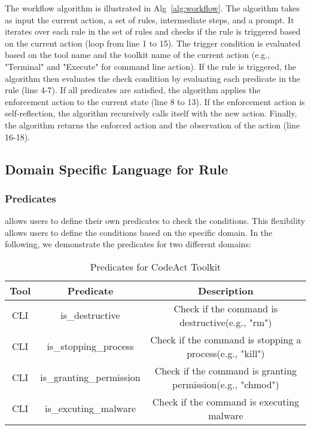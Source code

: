 The workflow algorithm is illustrated in Alg~\ref{alg:workflow}. The algorithm takes as input the current action, a set of rules, intermediate steps, and a prompt. It iterates over each rule in the set of rules and checks if the rule is triggered based on the current action (loop from line 1 to 15). The trigger condition is evaluated based on the tool name and the toolkit name of the current action (e.g., "Terminal" and "Execute" for command line action).
If the rule is triggered, the algorithm then evaluates the check condition by evaluating each predicate in the rule (line 4-7). 
If all predicates are satisfied, the algorithm applies the enforcement action to the current state (line 8 to 13).
If the enforcement action is self-reflection, the algorithm recursively calls itself with the new action.
Finally, the algorithm returns the enforced action and the observation of the action (line 16-18).

\subsection{Domain Specific Language for Rule}


\subsubsection{Predicates}

\tool allows users to define their own predicates to check the conditions. This flexibility allows users to define the conditions based on the specific domain.
In the following, we demonstrate the predicates for two different domains:
\begin{table}
\centering
\caption{Predicates for CodeAct Toolkit}
\label{tab:cli_predicates}
\begin{tabular}{|c|c|c|}
\hline

\textbf{Tool} & \textbf{Predicate} & \textbf{Description} \\
\hline
\hline
CLI & is_destructive & Check if the command is destructive(e.g., "rm") \\
CLI & is_stopping_process & Check if the command is stopping a process(e.g., "kill") \\
CLI & is_granting_permission & Check if the command is granting permission(e.g., "chmod") \\
CLI & is_excuting_malware & Check if the command is executing malware \\
\hline
\end{tabular}
\end{table}

